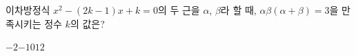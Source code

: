 이차방정식 $x^2-(2k-1)x+k=0$의 두 근을 $\alpha$, $\beta$라 할 때, $\alpha\beta(\alpha+\beta)=3$을 만족시키는 정수 $k$의 값은?
\begin{choices32}{$-2$}{$-1$}{$0$}{$1$}{$2$}\end{choices32}
